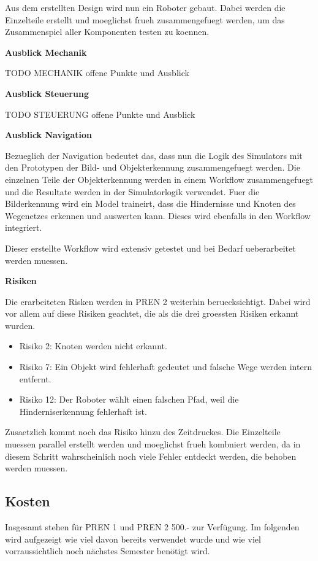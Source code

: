 Aus dem erstellten Design wird nun ein Roboter gebaut. Dabei werden die Einzelteile erstellt und moeglichst frueh zusammengefuegt werden, um das Zusammenspiel aller Komponenten testen zu koennen.

\textbf{Ausblick Mechanik}

TODO MECHANIK offene Punkte und Ausblick

\textbf{Ausblick Steuerung}

TODO STEUERUNG offene Punkte und Ausblick

\textbf{Ausblick Navigation}

Bezueglich der Navigation bedeutet das, dass nun die Logik des Simulators mit den Prototypen der Bild- und Objekterkennung zusammengefuegt werden. Die einzelnen Teile der Objekterkennung werden in einem Workflow zusammengefuegt und die Resultate werden in der Simulatorlogik verwendet. Fuer die Bilderkennung wird ein Model traineirt, dass die Hindernisse und Knoten des Wegenetzes erkennen und auswerten kann. Dieses wird ebenfalls in den Workflow integriert.

Dieser erstellte Workflow wird extensiv getestet und bei Bedarf ueberarbeitet werden muessen.

\textbf{Risiken}

Die erarbeiteten Risken werden in PREN 2 weiterhin beruecksichtigt. Dabei wird vor allem auf diese Risiken geachtet, die als die drei groessten Risiken erkannt wurden.

\begin{itemize}
    \item Risiko 2: Knoten werden nicht erkannt.
    \item Risiko 7: Ein Objekt wird fehlerhaft gedeutet und falsche Wege werden intern entfernt.
    \item Risiko 12: Der Roboter wählt einen falschen Pfad, weil die Hinderniserkennung fehlerhaft ist.
\end{itemize}

Zusaetzlich kommt noch das Risiko hinzu des Zeitdruckes. Die Einzelteile muessen parallel erstellt werden und moeglichst frueh kombniert werden, da in diesem Schritt wahrscheinlich noch viele Fehler entdeckt werden, die behoben werden muessen. 

\subsection{Kosten}\label{kosten}

Insgesamt stehen für PREN 1 und PREN 2 500.- zur Verfügung. Im folgenden wird aufgezeigt wie viel davon bereits verwendet wurde und wie viel vorraussichtlich noch nächstes Semester benötigt wird.


